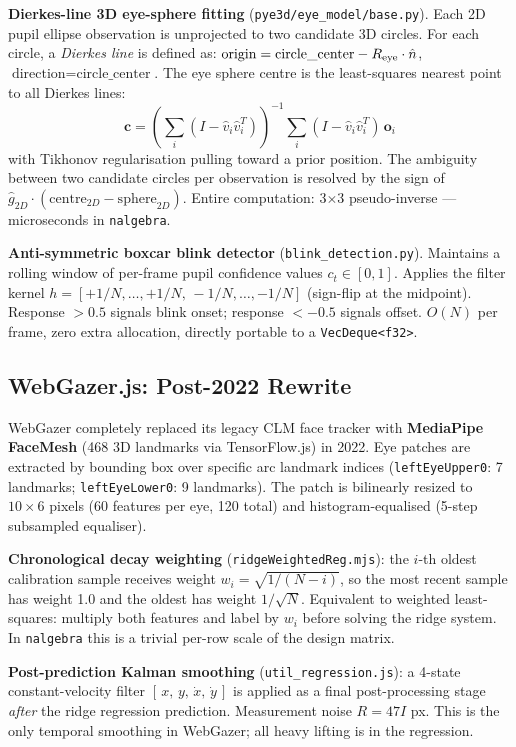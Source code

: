 \documentclass[11pt,a4paper]{article}
\begin{document}
\textbf{Dierkes-line 3D eye-sphere fitting} (\texttt{pye3d/eye\_model/base.py}).
Each 2D pupil ellipse observation is unprojected to two candidate 3D circles.
For each circle, a \emph{Dierkes line} is defined as:
$\text{origin} = \text{circle\_center} - R_{\rm eye} \cdot \hat{n}$,\;
$\text{direction} = \text{circle\_center}$.
The eye sphere centre is the least-squares nearest point to all Dierkes lines:
\[
  \mathbf{c} = \left(\sum_i (I - \hat{v}_i\hat{v}_i^T)\right)^{-1}
               \sum_i (I - \hat{v}_i\hat{v}_i^T)\,\mathbf{o}_i
\]
with Tikhonov regularisation pulling toward a prior position.
The ambiguity between two candidate circles per observation is resolved by the sign of
$\hat{g}_{2D} \cdot (\text{centre}_{2D} - \text{sphere}_{2D})$.
Entire computation: 3$\times$3 pseudo-inverse --- microseconds in \texttt{nalgebra}.

\textbf{Anti-symmetric boxcar blink detector} (\texttt{blink\_detection.py}).
Maintains a rolling window of per-frame pupil confidence values $c_t \in [0,1]$.
Applies the filter kernel $h = [+1/N,\ldots,+1/N,\,-1/N,\ldots,-1/N]$
(sign-flip at the midpoint).
Response $> 0.5$ signals blink onset; response $< -0.5$ signals offset.
$O(N)$ per frame, zero extra allocation, directly portable to a \texttt{VecDeque<f32>}.

\subsection{WebGazer.js: Post-2022 Rewrite}

WebGazer completely replaced its legacy CLM face tracker with
\textbf{MediaPipe FaceMesh} (468 3D landmarks via TensorFlow.js) in 2022.
Eye patches are extracted by bounding box over specific arc landmark indices
(\texttt{leftEyeUpper0}: 7 landmarks; \texttt{leftEyeLower0}: 9 landmarks).
The patch is bilinearly resized to $10\times6$ pixels (60 features per eye, 120 total)
and histogram-equalised (5-step subsampled equaliser).

\textbf{Chronological decay weighting} (\texttt{ridgeWeightedReg.mjs}):
the $i$-th oldest calibration sample receives weight
$w_i = \sqrt{1 / (N - i)}$, so the most recent sample has weight 1.0
and the oldest has weight $1/\sqrt{N}$.
Equivalent to weighted least-squares: multiply both features and label by $w_i$ before
solving the ridge system.
In \texttt{nalgebra} this is a trivial per-row scale of the design matrix.

\textbf{Post-prediction Kalman smoothing} (\texttt{util\_regression.js}):
a 4-state constant-velocity filter
$[\,x,\,y,\,\dot{x},\,\dot{y}\,]$ is applied as a final post-processing stage
\emph{after} the ridge regression prediction.
Measurement noise $R = 47I$ px.
This is the only temporal smoothing in WebGazer; all heavy lifting is in the regression.
\end{document}
